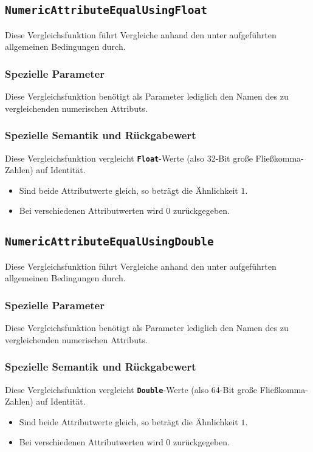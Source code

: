 \newpage
%
%
\subsection{\texttt{NumericAttributeEqualUsingFloat}}
Diese Vergleichsfunktion führt Vergleiche anhand den unter  aufgeführten allgemeinen Bedingungen durch.

\subsubsection*{Spezielle Parameter}
Diese Vergleichsfunktion benötigt als Parameter lediglich den Namen des zu vergleichenden numerischen Attributs.

\subsubsection*{Spezielle Semantik und Rückgabewert}
Diese Vergleichsfunktion vergleicht \textbf{\texttt{Float}}-Werte (also 32-Bit große Fließkomma-Zahlen) auf Identität.
\begin{itemize}
	\item Sind beide Attributwerte gleich, so beträgt die Ähnlichkeit $1$.
	\item Bei verschiedenen Attributwerten wird $0$ zurückgegeben.
\end{itemize}


%
%
\subsection{\texttt{NumericAttributeEqualUsingDouble}}
Diese Vergleichsfunktion führt Vergleiche anhand den unter  aufgeführten allgemeinen Bedingungen durch.

\subsubsection*{Spezielle Parameter}
Diese Vergleichsfunktion benötigt als Parameter lediglich den Namen des zu vergleichenden numerischen Attributs.

\subsubsection*{Spezielle Semantik und Rückgabewert}
Diese Vergleichsfunktion vergleicht \textbf{\texttt{Double}}-Werte (also 64-Bit große Fließkomma-Zahlen) auf Identität.
\begin{itemize}
	\item Sind beide Attributwerte gleich, so beträgt die Ähnlichkeit $1$.
	\item Bei verschiedenen Attributwerten wird $0$ zurückgegeben.
\end{itemize}
